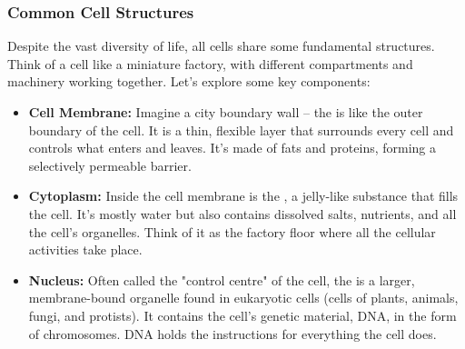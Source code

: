 \subsubsection{Common Cell Structures}

Despite the vast diversity of life, all cells share some fundamental structures. Think of a cell like a miniature factory, with different compartments and machinery working together.  Let's explore some key components:

\begin{itemize}
    \item \textbf{Cell Membrane:}  Imagine a city boundary wall – the  is like the outer boundary of the cell. It is a thin, flexible layer that surrounds every cell and controls what enters and leaves.  It's made of fats and proteins, forming a selectively permeable barrier. 

    \item \textbf{Cytoplasm:}  Inside the cell membrane is the , a jelly-like substance that fills the cell.  It's mostly water but also contains dissolved salts, nutrients, and all the cell's organelles.  Think of it as the factory floor where all the cellular activities take place.

    \item \textbf{Nucleus:} Often called the "control centre" of the cell, the  is a larger, membrane-bound organelle found in eukaryotic cells (cells of plants, animals, fungi, and protists). It contains the cell's genetic material, DNA, in the form of chromosomes.  DNA holds the instructions for everything the cell does.  


\end{itemize}
